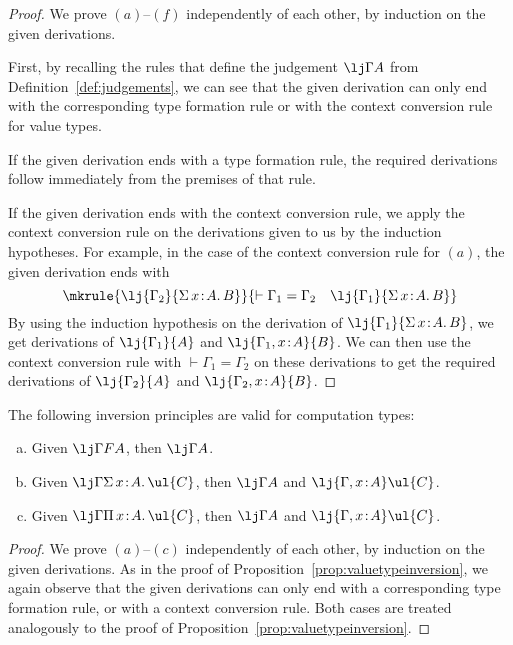 \begin{proof}
We prove $(a)$--$(f)$ independently of each other, by induction on the given derivations. 

First, by recalling the rules that define the judgement $\lj \Gamma A$ from Definition~\ref{def:judgements}, we can see that the given derivation can only end with the corresponding type formation rule or with the context conversion rule for value types.

If the given derivation ends with a type formation rule, the required derivations follow immediately from the premises of that rule.

If the given derivation ends with the context conversion rule, we apply the context conversion rule on the derivations given to us by the induction hypotheses. For example, in the case of the context conversion rule for $(a)$, the given derivation ends with
\[
\mkrule
{\lj {\Gamma_2} {\Sigma\, x \!:\! A .\, B}}
{\vdash \Gamma_1 = \Gamma_2 \quad \lj {\Gamma_1} {\Sigma\, x \!:\! A .\, B}}
\]
By using the induction hypothesis on the derivation of $\lj {\Gamma_1} {\Sigma\, x \!:\! A .\, B}$, we get derivations of $\lj {\Gamma_1} {A}$ and $\lj {\Gamma_1, x \!:\! A} {B}$. We can then use the context conversion rule with $\vdash \Gamma_1 = \Gamma_2$ on these derivations to get the required derivations of $\lj {\Gamma_2} {A}$ and $\lj {\Gamma_2, x \!:\! A} {B}$.
\end{proof}

\begin{proposition} 
\label{prop:computationtypeinversion}
The following inversion principles are valid for computation types:
\begin{enumerate}[(a)]
\item Given $\lj \Gamma {FA}$, then $\lj \Gamma A$.
\item Given $\lj \Gamma {\Sigma\, x \!:\! A .\, \ul{C}}$, then $\lj \Gamma A$ and $\lj {\Gamma, x \!:\! A} \ul{C}$.
\item Given $\lj \Gamma {\Pi\, x \!:\! A .\, \ul{C}}$, then $\lj \Gamma A$ and $\lj {\Gamma, x \!:\! A} \ul{C}$.
\end{enumerate}
\end{proposition}

\begin{proof}
We prove $(a)$--$(c)$ independently of each other, by induction on the given derivations. As in the proof of Proposition~\ref{prop:valuetypeinversion}, we again observe that the given derivations can only end with a corresponding type formation rule, or with a context conversion rule. Both cases are treated analogously to the proof of Proposition~\ref{prop:valuetypeinversion}.
\end{proof}


